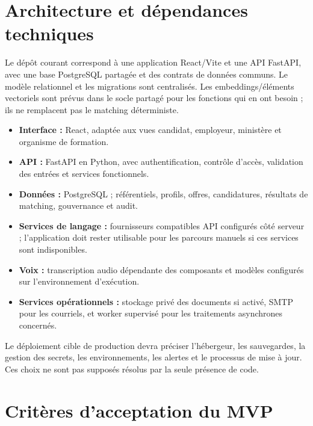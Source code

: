 \documentclass[11pt,a4paper]{article}
\begin{document}
\section{Architecture et dépendances techniques}

Le dépôt courant correspond à une application React/Vite et une API FastAPI, avec une base PostgreSQL partagée et des contrats de données communs. Le modèle relationnel et les migrations sont centralisés. Les embeddings/éléments vectoriels sont prévus dans le socle partagé pour les fonctions qui en ont besoin ; ils ne remplacent pas le matching déterministe.

\begin{itemize}
  \item \textbf{Interface :} React, adaptée aux vues candidat, employeur, ministère et organisme de formation.
  \item \textbf{API :} FastAPI en Python, avec authentification, contrôle d'accès, validation des entrées et services fonctionnels.
  \item \textbf{Données :} PostgreSQL ; référentiels, profils, offres, candidatures, résultats de matching, gouvernance et audit.
  \item \textbf{Services de langage :} fournisseurs compatibles API configurés côté serveur ; l'application doit rester utilisable pour les parcours manuels si ces services sont indisponibles.
  \item \textbf{Voix :} transcription audio dépendante des composants et modèles configurés sur l'environnement d'exécution.
  \item \textbf{Services opérationnels :} stockage privé des documents si activé, SMTP pour les courriels, et worker supervisé pour les traitements asynchrones concernés.
\end{itemize}

Le déploiement cible de production devra préciser l'hébergeur, les sauvegardes, la gestion des secrets, les environnements, les alertes et le processus de mise à jour. Ces choix ne sont pas supposés résolus par la seule présence de code.

\section{Critères d'acceptation du MVP}
\end{document}

